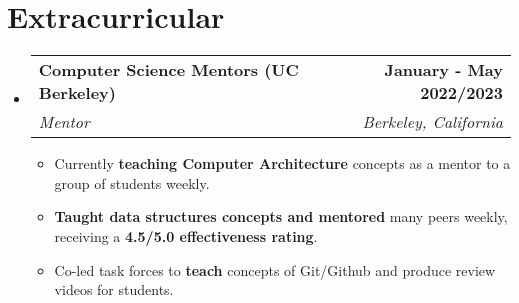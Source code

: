 \documentclass[letterpaper,11pt]{article}
\makeatletter
\newcommand{\resumeItem}[1]{
  \item\small{
    {#1 \vspace{-2pt}}
  }
}
\newcommand{\resumeSubheading}[4]{
  \vspace{-2pt}\item
    \begin{tabular*}{1.0\textwidth}[t]{l@{\extracolsep{\fill}}r}
      \textbf{#1} & \textbf{\small #2} \\
      \textit{\small#3} & \textit{\small #4} \\
    \end{tabular*}\vspace{-7pt}
}
\newcommand{\resumeSubHeadingListStart}{\begin{itemize}[leftmargin=0.0in, label={}]}
\newcommand{\resumeSubHeadingListEnd}{\end{itemize}}
\newcommand{\resumeItemListStart}{\begin{itemize}}
\newcommand{\resumeItemListEnd}{\end{itemize}\vspace{-5pt}}
\makeatother
\begin{document}
\section{Extracurricular}
\resumeSubHeadingListStart
\resumeSubheading
{Computer Science Mentors (UC Berkeley)}{January - May 2022/2023}
{Mentor}{Berkeley, California}
\resumeItemListStart
  \resumeItem{Currently \textbf{teaching Computer Architecture} concepts as a mentor to a group of students weekly. }
  \resumeItem{\textbf{Taught data structures concepts and mentored} many peers weekly, receiving a \textbf{4.5/5.0 effectiveness rating}.}
  \resumeItem{ Co-led task forces to \textbf{teach} concepts of Git/Github and produce review videos for students.}
  \resumeItemListEnd
\resumeSubHeadingListEnd
\vspace{-16pt}
\end{document}

